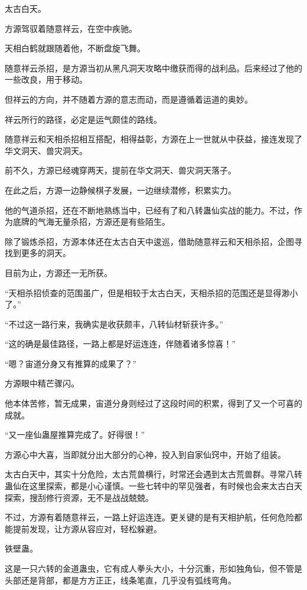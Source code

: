
\begin{this_body}

太古白天。

方源驾驭着随意祥云，在空中疾驰。

天相白鹤就跟随着他，不断盘旋飞舞。

随意祥云杀招，是方源当初从黑凡洞天攻略中缴获而得的战利品。后来经过了他的一些改良，用于移动。

但祥云的方向，并不随着方源的意志而动，而是遵循着运道的奥妙。

祥云所行的路径，必定是运气颇佳的路线。

随意祥云和天相杀招相互搭配，相得益彰，方源在上一世就从中获益，接连发现了华文洞天、兽灾洞天。

前不久，方源已经魂穿两天，提前在华文洞天、兽灾洞天落子。

在此之后，方源一边静候棋子发展，一边继续潜修，积累实力。

他的气道杀招，还在不断地熟练当中，已经有了和八转蛊仙实战的能力。不过，作为底牌的气海无量杀招，方源还是有些陌生。

除了锻炼杀招，方源本体还在太古白天中逡巡，借助随意祥云和天相杀招，企图寻找到更多的洞天。

目前为止，方源还一无所获。

“天相杀招侦查的范围虽广，但是相较于太古白天，天相杀招的范围还是显得渺小了。”

“不过这一路行来，我确实是收获颇丰，八转仙材斩获许多。”

“这的确是最佳路径，一路上都是好运连连，伴随着诸多惊喜！”

“嗯？宙道分身又有推算的成果了？”

方源眼中精芒骤闪。

他本体苦修，暂无成果，宙道分身则经过了这段时间的积累，得到了又一个可喜的成就。

“又一座仙蛊屋推算完成了。好得很！”

方源心中大喜，当即就分出大部分的心神，投入到自家仙窍中，开始了组装。

太古白天中，其实十分危险，太古荒兽横行，时常还会遇到太古荒兽群。寻常八转蛊仙在这里探索，都是小心谨慎。一些七转中的罕见强者，有时候也会来太古白天探索，搜刮修行资源，无不是战战兢兢。

不过，方源有着随意祥云，一路上好运连连。更关键的是有天相护航，任何危险都能提前发现，让方源从容应对，轻松躲避。

铁壁蛊。

这是一只六转的金道蛊虫，它有成人拳头大小，十分沉重，形如独角仙，但不管是头部还是背部，都是方方正正，线条笔直，几乎没有弧线弯角。


\end{this_body}
